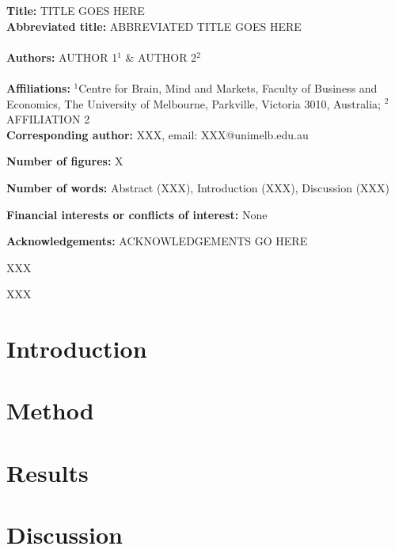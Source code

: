 \documentclass[12pt,a4paper]{article}
\begin{document}
\noindent
{\bf Title:} TITLE GOES HERE\\

\noindent
{\bf Abbreviated title:} ABBREVIATED TITLE GOES HERE \\
\\
\noindent 
{\bf Authors:} AUTHOR 1$^{1}$ \& AUTHOR 2$^2$\\
\ \\
{\bf Affiliations:} $^1$Centre for Brain, Mind and Markets, Faculty of Business and Economics, The University of Melbourne, Parkville, Victoria 3010, Australia; $^2$AFFILIATION 2 \\

\noindent
{\bf Corresponding author:} XXX, email: XXX@unimelb.edu.au 

\noindent
{\bf Number of figures:} X 

\noindent
{\bf Number of words:} Abstract (XXX), Introduction (XXX), Discussion (XXX)

\noindent
{\bf Financial interests or conflicts of interest:} None 

\noindent
{\bf Acknowledgements:} ACKNOWLEDGEMENTS GO HERE


\newpage
\linenumbers

 XXX

\newpage

 XXX

\newpage

\onehalfspacing

\section*{Introduction} \label{sec:intro}

\section*{Method} \label{sec:method}

\section*{Results} \label{sec:results}

\section*{Discussion} \label{sec:discussion}
\end{document}
